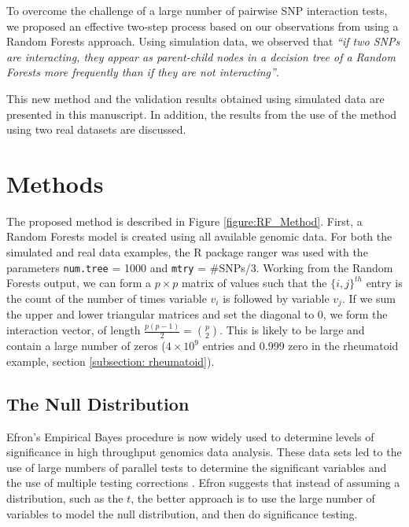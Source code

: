 \documentclass[preprint,12pt,3p]{elsarticle}
\begin{document}
To overcome the challenge of a large number of pairwise SNP interaction tests, we proposed an effective two-step process
based on our observations from using a Random Forests approach. Using simulation data, we observed that \textit{``if two SNPs are
interacting, they appear as parent-child nodes in a decision tree of a Random Forests more frequently than if they are
not interacting''}.

This new method and the validation results obtained using simulated data are presented in this manuscript. In
addition, the results from the use of the method using two real datasets are discussed.


\section{Methods}

The proposed method is described in Figure \ref{figure:RF_Method}. First, a Random Forests model is created using all
available genomic data. For both the simulated and real data examples, the R package ranger
\cite[]{Wright.and.Ziegler.2017} was used with the parameters \texttt{num.tree} = 1000 and \texttt{mtry} = \#SNPs/3.
Working from the Random Forests output, we can form a $p \times p$ matrix of values such that the $\{i,j\}^{th}$ entry is the count of the
number of times variable $v_i$ is followed by variable $v_j$.  If we sum the upper and lower triangular matrices and set the diagonal to 0,
we form the interaction vector, of length $\frac {p(p-1)} 2 = {p \choose 2}$.  This is likely to be large and contain a large number of
zeros ($4 \times 10^9$ entries and 0.999 zero in the rheumatoid example, section \ref{subsection: rheumatoid}).

\subsection{The Null Distribution}

Efron's Empirical Bayes procedure \cite[]{efronLargeScaleInferenceEmpirical2010} is now widely used to determine levels of significance in
high throughput genomics data analysis.  These data sets led to the use of large numbers of parallel tests to determine the significant
variables and the use of multiple testing corrections \cite{limma.2015}.  Efron suggests that instead of assuming a distribution, such as
the $t$, the better approach is to use the large number of variables to model the null distribution, and then do significance testing.
\end{document}
